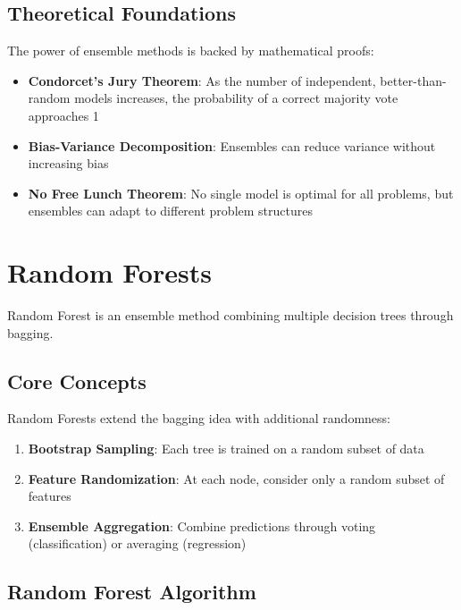 \documentclass[
  letterpaper,
  DIV=11,
  numbers=noendperiod]{scrreprt}
\providecommand{\tightlist}{%
  \setlength{\itemsep}{0pt}\setlength{\parskip}{0pt}}\usepackage{longtable,booktabs,array}
\begin{document}
\subsection{Theoretical Foundations}\label{theoretical-foundations}

The power of ensemble methods is backed by mathematical proofs:

\begin{itemize}
\tightlist
\item
  \textbf{Condorcet's Jury Theorem}: As the number of independent,
  better-than-random models increases, the probability of a correct
  majority vote approaches 1
\item
  \textbf{Bias-Variance Decomposition}: Ensembles can reduce variance
  without increasing bias
\item
  \textbf{No Free Lunch Theorem}: No single model is optimal for all
  problems, but ensembles can adapt to different problem structures
\end{itemize}

\section{Random Forests}\label{random-forests}

Random Forest is an ensemble method combining multiple decision trees
through bagging.

\subsection{Core Concepts}\label{core-concepts-1}

Random Forests extend the bagging idea with additional randomness:

\begin{enumerate}
\def\labelenumi{\arabic{enumi}.}
\tightlist
\item
  \textbf{Bootstrap Sampling}: Each tree is trained on a random subset
  of data
\item
  \textbf{Feature Randomization}: At each node, consider only a random
  subset of features
\item
  \textbf{Ensemble Aggregation}: Combine predictions through voting
  (classification) or averaging (regression)
\end{enumerate}

\subsection{Random Forest Algorithm}\label{random-forest-algorithm}
\end{document}
